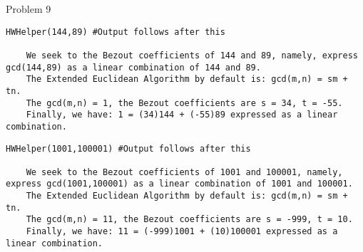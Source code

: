 \begin{problem}{Problem 9}
    \begin{highlight}[Solution - \# 43]
    \begin{lstlisting}[style=stackoverflow]
    HWHelper(144,89) #Output follows after this

    We seek to the Bezout coefficients of 144 and 89, namely, express gcd(144,89) as a linear combination of 144 and 89.
    The Extended Euclidean Algorithm by default is: gcd(m,n) = sm + tn.
    The gcd(m,n) = 1, the Bezout coefficients are s = 34, t = -55.
    Finally, we have: 1 = (34)144 + (-55)89 expressed as a linear combination.
    \end{lstlisting}
    \end{highlight}

    \begin{highlight}[Solution - \# 44]
    \begin{lstlisting}[style=stackoverflow]
    HWHelper(1001,100001) #Output follows after this

    We seek to the Bezout coefficients of 1001 and 100001, namely, express gcd(1001,100001) as a linear combination of 1001 and 100001.
    The Extended Euclidean Algorithm by default is: gcd(m,n) = sm + tn.
    The gcd(m,n) = 11, the Bezout coefficients are s = -999, t = 10.
    Finally, we have: 11 = (-999)1001 + (10)100001 expressed as a linear combination.
    \end{lstlisting}
    \end{highlight}
\end{problem}

